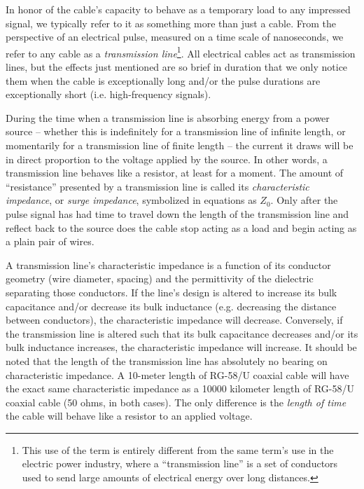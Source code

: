 In honor of the cable's capacity to behave as a temporary load to any impressed signal, we typically refer to it as something more than just a cable.  From the perspective of an electrical pulse, measured on a time scale of nanoseconds, we refer to any cable as a \textit{transmission line}\footnote{This use of the term is entirely different from the same term's use in the electric power industry, where a ``transmission line'' is a set of conductors used to send large amounts of electrical energy over long distances.}.  All electrical cables act as transmission lines, but the effects just mentioned are so brief in duration that we only notice them when the cable is exceptionally long and/or the pulse durations are exceptionally short (i.e. high-frequency signals).  

During the time when a transmission line is absorbing energy from a power source -- whether this is indefinitely for a transmission line of infinite length, or momentarily for a transmission line of finite length -- the current it draws will be in direct proportion to the voltage applied by the source.  In other words, a transmission line behaves like a resistor, at least for a moment.  The amount of ``resistance'' presented by a transmission line is called its \textit{characteristic impedance}, or \textit{surge impedance}, symbolized in equations as $Z_0$.  Only after the pulse signal has had time to travel down the length of the transmission line and reflect back to the source does the cable stop acting as a load and begin acting as a plain pair of wires.        

A transmission line's characteristic impedance is a function of its conductor geometry (wire diameter, spacing) and the permittivity of the dielectric separating those conductors.  If the line's design is altered to increase its bulk capacitance and/or decrease its bulk inductance (e.g. decreasing the distance between conductors), the characteristic impedance will decrease.  Conversely, if the transmission line is altered such that its bulk capacitance decreases and/or its bulk inductance increases, the characteristic impedance will increase.  It should be noted that the length of the transmission line has absolutely no bearing on characteristic impedance.  A 10-meter length of RG-58/U coaxial cable will have the exact same characteristic impedance as a 10000 kilometer length of RG-58/U coaxial cable (50 ohms, in both cases).  The only difference is the \textit{length of time} the cable will behave like a resistor to an applied voltage.








